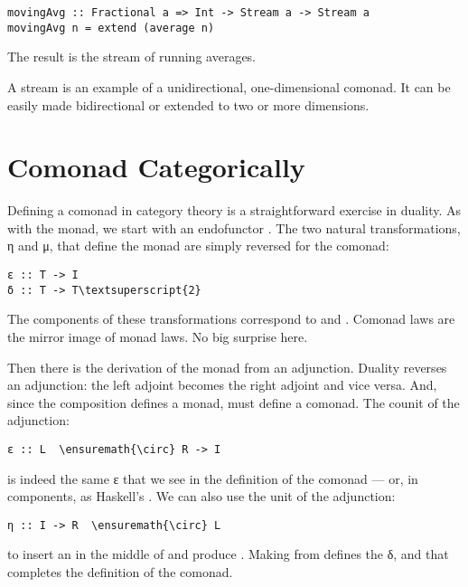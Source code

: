 \begin{Verbatim}[commandchars=\\\{\}]
movingAvg :: Fractional a => Int -> Stream a -> Stream a
movingAvg n = extend (average n)
\end{Verbatim}
The result is the stream of running averages.

A stream is an example of a unidirectional, one-dimensional comonad. It
can be easily made bidirectional or extended to two or more dimensions.

\section{Comonad Categorically}\label{comonad-categorically}

Defining a comonad in category theory is a straightforward exercise in
duality. As with the monad, we start with an endofunctor . The
two natural transformations, η and μ, that define the monad are simply
reversed for the comonad:

\begin{Verbatim}[commandchars=\\\{\}]
ε :: T -> I
δ :: T -> T\textsuperscript{2}
\end{Verbatim}
The components of these transformations correspond to 
and . Comonad laws are the mirror image of monad laws.
No big surprise here.

Then there is the derivation of the monad from an adjunction. Duality
reverses an adjunction: the left adjoint becomes the right adjoint and
vice versa. And, since the composition  defines a monad,
 must define a comonad. The counit of the adjunction:

\begin{Verbatim}[commandchars=\\\{\}]
ε :: L  \ensuremath{\circ} R -> I
\end{Verbatim}
is indeed the same ε that we see in the definition of the comonad ---
or, in components, as Haskell's . We can also use the
unit of the adjunction:

\begin{Verbatim}[commandchars=\\\{\}]
η :: I -> R  \ensuremath{\circ} L
\end{Verbatim}
to insert an  in the middle of  and
produce . Making  from 
defines the δ, and that completes the definition of the comonad.

